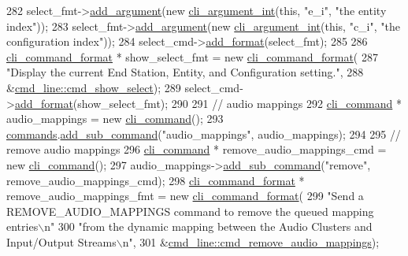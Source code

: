 \begin{DoxyCode}
282     select\_fmt->\hyperlink{classcli__command__format_ac3fc6d13a227c195d5ee6f7b78eba9cd}{add\_argument}(\textcolor{keyword}{new} \hyperlink{classcli__argument__int}{cli\_argument\_int}(\textcolor{keyword}{this}, \textcolor{stringliteral}{"e\_i"}, \textcolor{stringliteral}{"the entity
       index"}));
283     select\_fmt->\hyperlink{classcli__command__format_ac3fc6d13a227c195d5ee6f7b78eba9cd}{add\_argument}(\textcolor{keyword}{new} \hyperlink{classcli__argument__int}{cli\_argument\_int}(\textcolor{keyword}{this}, \textcolor{stringliteral}{"c\_i"}, \textcolor{stringliteral}{"the
       configuration index"}));
284     select\_cmd->\hyperlink{classcli__command_aa9ec38e761644d946f8db2b920e39921}{add\_format}(select\_fmt);
285 
286     \hyperlink{classcli__command__format}{cli\_command\_format} * show\_select\_fmt = \textcolor{keyword}{new} 
      \hyperlink{classcli__command__format}{cli\_command\_format}(
287         \textcolor{stringliteral}{"Display the current End Station, Entity, and Configuration setting."},
288         &\hyperlink{classcmd__line_ab4568bddc5b3f92bd5b52a5898bc1c52}{cmd\_line::cmd\_show\_select});
289     select\_cmd->\hyperlink{classcli__command_aa9ec38e761644d946f8db2b920e39921}{add\_format}(show\_select\_fmt);
290 
291     \textcolor{comment}{// audio mappings}
292     \hyperlink{classcli__command}{cli\_command} * audio\_mappings = \textcolor{keyword}{new} \hyperlink{classcli__command}{cli\_command}();
293     \hyperlink{classcmd__line_ae4fea670c2fdd2b60f7b5b6ad6fbaf1e}{commands}.\hyperlink{classcli__command_aa73a67e8ebb6facd4b40ced66279b226}{add\_sub\_command}(\textcolor{stringliteral}{"audio\_mappings"}, audio\_mappings);
294 
295     \textcolor{comment}{// remove audio mappings}
296     \hyperlink{classcli__command}{cli\_command} * remove\_audio\_mappings\_cmd = \textcolor{keyword}{new} \hyperlink{classcli__command}{cli\_command}();
297     audio\_mappings->\hyperlink{classcli__command_aa73a67e8ebb6facd4b40ced66279b226}{add\_sub\_command}(\textcolor{stringliteral}{"remove"}, remove\_audio\_mappings\_cmd);
298     \hyperlink{classcli__command__format}{cli\_command\_format} * remove\_audio\_mappings\_fmt = \textcolor{keyword}{new} 
      \hyperlink{classcli__command__format}{cli\_command\_format}(
299         \textcolor{stringliteral}{"Send a REMOVE\_AUDIO\_MAPPINGS command to remove the queued mapping entries\(\backslash\)n"}
300         \textcolor{stringliteral}{"from the dynamic mapping between the Audio Clusters and Input/Output Streams\(\backslash\)n"},
301         &\hyperlink{classcmd__line_aafc563b9d7f84f46d8bc9c55d8783578}{cmd\_line::cmd\_remove\_audio\_mappings});

\end{DoxyCode}
